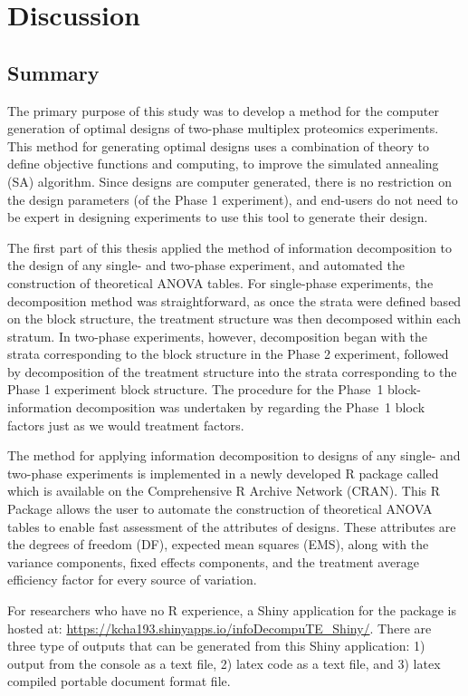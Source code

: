 \chapter{Discussion}
\section{Summary}
The primary purpose of this study was to develop a method for the computer generation of optimal designs of two-phase multiplex proteomics experiments. This method for generating optimal designs uses a combination of theory to define objective functions and computing, to improve the simulated annealing (SA) algorithm. Since designs are computer generated, there is no restriction on the design parameters (of the Phase 1 experiment), and end-users do not need to be expert in designing experiments to use this tool to generate their design.    

The first part of this thesis applied the method of information decomposition to the design of any single- and two-phase experiment, and automated the construction of theoretical ANOVA tables. For single-phase experiments, the decomposition method was straightforward, as once the strata were defined based on the block structure, the treatment structure was then decomposed within each stratum. In two-phase experiments, however, decomposition began with the strata corresponding to the block structure in the Phase 2 experiment, followed by decomposition of the treatment structure into the strata corresponding to the Phase 1 experiment block structure. The procedure for the Phase~1 block-information decomposition was undertaken by regarding the Phase~1 block factors just as we would treatment factors. 

The method for applying information decomposition to designs of any single- and two-phase experiments is implemented in a newly developed \textsf{R} package called  which is available on the Comprehensive \textsf{R} Archive Network (CRAN). This \textsf{R} Package allows the user to automate the construction of theoretical ANOVA tables to enable fast assessment of the attributes of designs. These attributes are the degrees of freedom (DF), expected mean squares (EMS), along with the variance components, fixed effects components, and the treatment average efficiency factor for every source of variation. 

For researchers who have no \textsf{R} experience, a Shiny application for the  package is hosted at:
\url{https://kcha193.shinyapps.io/infoDecompuTE_Shiny/}. There are three type of outputs that can be generated from this Shiny application: 1) output from the  console as a text file, 2) latex code as a text file, and 3) latex compiled portable document format file. 


